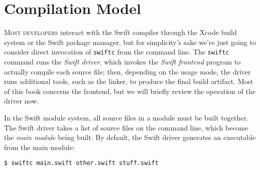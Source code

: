 \documentclass[../generics]{subfiles}
\begin{document}
\chapter{Compilation Model}\label{compilation model}

\lettrine{M}{ost developers} interact with the Swift compiler through the Xcode build system or the Swift package manager, but for simplicity's sake we're just going to consider direct invocation of \texttt{swiftc} from the command line. The \texttt{swiftc} command runs the \emph{Swift driver}, which invokes the \emph{Swift frontend} program to actually compile each source file; then, depending on the usage mode, the driver runs additional tools, such as the linker, to produce the final build artifact. Most of this book concerns the frontend, but we will briefly review the operation of the driver now.

In the Swift module system, all source files in a module must be built together. The Swift driver takes a list of source files on the command line, which become the \emph{main module} being built. By default, the Swift driver generates an executable from the main module:
\begin{Verbatim}
$ swiftc main.swift other.swift stuff.swift
\end{Verbatim}
\end{document}
